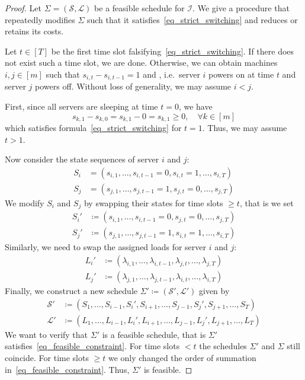 \documentclass[hidelinks]{article}
\theoremstyle{plain}
\theoremstyle{definition}
\theoremstyle{rem}
\newcommand{\inp}{\mathcal{I}}
\begin{document}
\begin{proof}
Let $\Sigma=(\mathcal{S},\mathcal{L})$ be a feasible schedule for $\inp$. We give a procedure that repeatedly modifies $\Sigma$ such that it satisfies~\eqref{eq_strict_switching} and reduces or retains its costs. 
	
Let $t\in[T]$ be the first time slot falsifying~\eqref{eq_strict_switching}. If there does not exist such a time slot, we are done. Otherwise, we can obtain machines $i,j\in[m]$ such that $s_{i,t}-s_{i,t-1}=1$ and , i.e.\ server $i$ powers on at time $t$ and server $j$ powers off. Without loss of generality, we may assume $i<j$. 
	
First, since all servers are sleeping at time $t=0$, we have
\begin{equation*}
	s_{k,1}-s_{k,0}=s_{k,1}-0=s_{k,1}\ge 0,\quad\forall k\in[m]
\end{equation*}
which satisfies formula~\eqref{eq_strict_switching} for $t=1$.
Thus, we may assume $t>1$. 
	
Now consider the state sequences of server $i$ and $j$:
\begin{align*}
	S_i&=(s_{i,1},\ldots,s_{i,t-1}=0,s_{i,t}=1,\ldots,s_{i,T})\\
	S_j&=(s_{j,1},\ldots,s_{j,t-1}=1,s_{j,t}=0,\ldots,s_{j,T})
\end{align*}
We modify $S_i$ and $S_j$ by swapping their states for time slots $\ge t$, that is we set
\begin{align*}
	S_i'&\coloneqq(s_{i,1},\ldots,s_{i,t-1}=0,s_{j,t}=0,\ldots,s_{j,T})\\
	S_j'&\coloneqq(s_{j,1},\ldots,s_{j,t-1}=1,s_{i,t}=1,\ldots,s_{i,T})
\end{align*}
Similarly, we need to swap the assigned loads for server $i$ and $j$:
\begin{align*}
	L_i'&\coloneqq(\lambda_{i,1},\ldots,\lambda_{i,t-1},\lambda_{j,t},\ldots,\lambda_{j,T})\\
	L_j'&\coloneqq(\lambda_{j,1},\ldots,\lambda_{j,t-1},\lambda_{i,t},\ldots,\lambda_{i,T})
\end{align*}
Finally, we construct a new schedule $\Sigma'\coloneqq(\mathcal{S}',\mathcal{L}')$ given by 
\begin{align*}
	\mathcal{S}'&\coloneqq(S_1,\ldots,S_{i-1},S_i',S_{i+1},\ldots,S_{j-1},S_j',S_{j+1},\ldots,S_T)\\
	\mathcal{L}'&\coloneqq(L_1,\ldots,L_{i-1},L_i',L_{i+1},\ldots,L_{j-1},L_j',L_{j+1},\ldots,L_T)
\end{align*}
We want to verify that $\Sigma'$ is a feasible schedule, that is $\Sigma'$ satisfies~\eqref{eq_feasible_constraint}. For time slots $<t$ the schedules $\Sigma'$ and $\Sigma$ still coincide. For time slots $\ge t$ we only changed the order of summation in~\eqref{eq_feasible_constraint}. Thus, $\Sigma'$ is feasible.


\end{proof}
\end{document}
